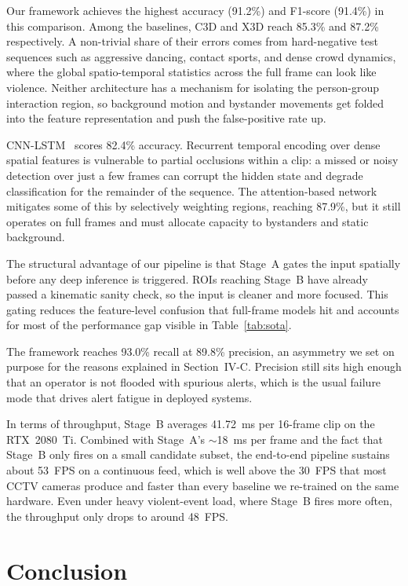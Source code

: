 \documentclass[conference]{IEEEtran}
\begin{document}
Our framework achieves the highest accuracy (91.2\%) and F1-score (91.4\%) in this comparison. Among the baselines, C3D and X3D reach 85.3\% and 87.2\% respectively. A non-trivial share of their errors comes from hard-negative test sequences such as aggressive dancing, contact sports, and dense crowd dynamics, where the global spatio-temporal statistics across the full frame can look like violence. Neither architecture has a mechanism for isolating the person-group interaction region, so background motion and bystander movements get folded into the feature representation and push the false-positive rate up.

CNN-LSTM~\cite{patel_realtime_2021} scores 82.4\% accuracy. Recurrent temporal encoding over dense spatial features is vulnerable to partial occlusions within a clip: a missed or noisy detection over just a few frames can corrupt the hidden state and degrade classification for the remainder of the sequence. The attention-based network~\cite{pan_violence_2022} mitigates some of this by selectively weighting regions, reaching 87.9\%, but it still operates on full frames and must allocate capacity to bystanders and static background.

The structural advantage of our pipeline is that Stage~A gates the input spatially before any deep inference is triggered. ROIs reaching Stage~B have already passed a kinematic sanity check, so the input is cleaner and more focused. This gating reduces the feature-level confusion that full-frame models hit and accounts for most of the performance gap visible in Table~\ref{tab:sota}.

The framework reaches 93.0\% recall at 89.8\% precision, an asymmetry we set on purpose for the reasons explained in Section~IV-C. Precision still sits high enough that an operator is not flooded with spurious alerts, which is the usual failure mode that drives alert fatigue in deployed systems.

In terms of throughput, Stage~B averages 41.72~ms per 16-frame clip on the RTX~2080~Ti. Combined with Stage~A's $\sim$18~ms per frame and the fact that Stage~B only fires on a small candidate subset, the end-to-end pipeline sustains about 53~FPS on a continuous feed, which is well above the 30~FPS that most CCTV cameras produce and faster than every baseline we re-trained on the same hardware. Even under heavy violent-event load, where Stage~B fires more often, the throughput only drops to around 48~FPS.


\section{Conclusion}
\end{document}
